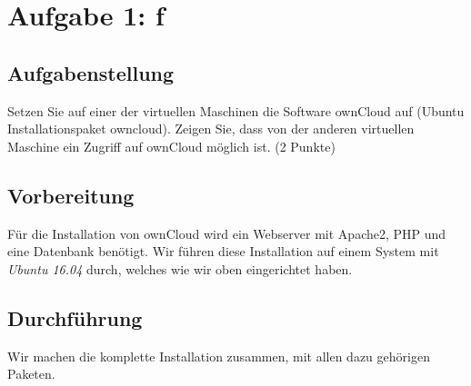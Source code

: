 \newpage

\section{Aufgabe 1: f}

\subsection{Aufgabenstellung}
Setzen Sie auf einer der virtuellen Maschinen die Software ownCloud auf (Ubuntu Installationspaket owncloud). Zeigen Sie, dass von der anderen virtuellen Maschine ein Zugriff auf ownCloud möglich ist. (2 Punkte)

\subsection{Vorbereitung}
Für die Installation von ownCloud wird ein Webserver mit Apache2, PHP und eine Datenbank benötigt. Wir führen diese Installation auf einem System mit \textit{Ubuntu 16.04} durch, welches wie wir oben eingerichtet haben.

\subsection{Durchführung}
Wir machen die komplette Installation zusammen, mit allen dazu gehörigen Paketen. 

